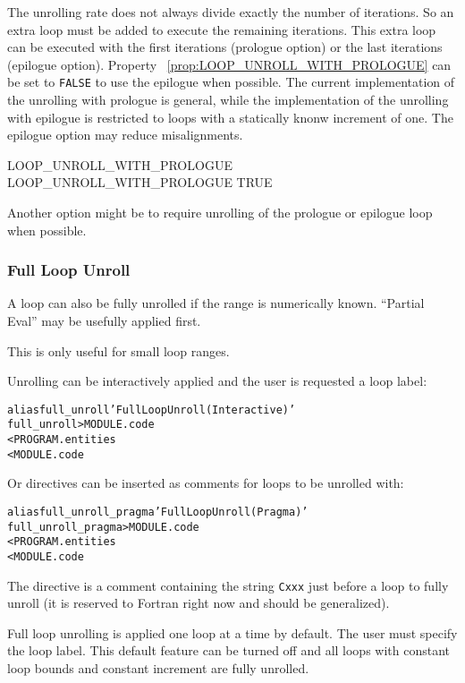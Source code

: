 \documentclass[a4paper]{report}
\newenvironment{PipsMake}{\begin{alltt}}{\end{alltt}}
\newcommand{\PipsPropRef}[1]{\texttt{\detokenize{#1}}~\ref{prop:#1}}
\newenvironment{PipsPass}[1]{\label{pass:#1}}{}
\newcommand{\PPartialEval}{{Partial Eval}}
\begin{document}
The unrolling rate does not always divide exactly the number of
iterations. So an extra loop must be added to execute the remaining
iterations. This extra loop can be executed with the first iterations
(prologue option) or the last iterations (epilogue option). Property
\PipsPropRef{LOOP_UNROLL_WITH_PROLOGUE} can be set to \verb/FALSE/ to
use the epilogue when possible. The current implementation of the
unrolling with prologue is general, while the implementation of the
unrolling with epilogue is restricted to loops with a statically knonw
increment of one. The epilogue option may reduce misalignments.
\begin{PipsProp}{LOOP_UNROLL_WITH_PROLOGUE}
LOOP_UNROLL_WITH_PROLOGUE TRUE
\end{PipsProp}

Another option might be to require unrolling of the prologue or
epilogue loop when possible.


\subsubsection{Full Loop Unroll}

\begin{PipsPass}{full_unroll}
A loop can also be fully unrolled if the range is numerically known.
``\PPartialEval'' may be usefully applied first.

This is only useful for small loop ranges.

Unrolling can be interactively applied and the user is requested a loop
label:
\end{PipsPass}

\begin{PipsMake}
alias full_unroll 'Full Loop Unroll (Interactive)'
full_unroll                          > MODULE.code
        < PROGRAM.entities
        < MODULE.code
\end{PipsMake}

Or directives can be inserted as comments for loops to be unrolled with:
\begin{PipsMake}
alias full_unroll_pragma 'Full Loop Unroll (Pragma)'
full_unroll_pragma                   > MODULE.code
        < PROGRAM.entities
        < MODULE.code
\end{PipsMake}
The directive is a comment containing the string \texttt{Cxxx} just before
a loop to fully unroll (it is reserved to Fortran right now and should be
generalized).


Full loop unrolling is applied one loop at a time by default. The user
must specify the loop label. This default feature can be turned off
and all loops with constant loop bounds and constant increment are
fully unrolled.
\end{document}

